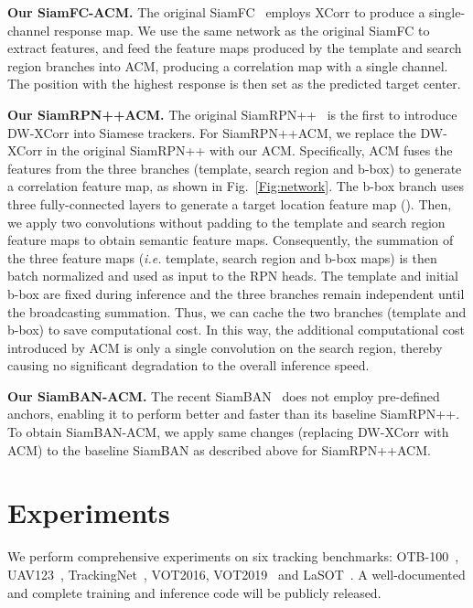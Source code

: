 \documentclass[10pt,twocolumn,letterpaper,final]{cvpr}
\begin{document}
\noindent\textbf{{Our SiamFC-ACM.}} The original SiamFC~\cite{bertinetto2016fully}
employs XCorr to produce a single-channel response map. We use the same network as the original SiamFC to extract features, and feed the feature maps produced by the template and search region branches into ACM, producing a correlation map with a single channel. The position with the highest response is then set as the predicted target center.





\noindent\textbf{{Our SiamRPN++ACM.}} The original SiamRPN++~\cite{li2019siamrpn} is the first to introduce DW-XCorr into Siamese trackers. For SiamRPN++ACM, we replace the DW-XCorr in the original SiamRPN++ with our ACM. Specifically, ACM fuses the features from the three branches (template, search region and b-box) to generate a correlation feature map, as shown in Fig.~\ref{Fig:network}. The b-box branch uses three fully-connected layers to generate a target location feature map (). Then, we apply two  convolutions without padding  to the template and search region feature maps to obtain semantic feature maps. Consequently, the summation of the three feature maps (\textit{i.e.} template, search region and b-box maps) is then batch normalized and used as input to the RPN heads. The template and initial b-box are fixed during inference and the three branches remain independent until the broadcasting summation. Thus, we can cache the two branches (template and b-box) to save computational cost. In this way, the additional computational cost introduced by ACM is only a single convolution on the search region, thereby causing no significant degradation to the overall inference speed. 



\noindent\textbf{{Our SiamBAN-ACM.}} The recent  SiamBAN~\cite{chen2020siamese} does not employ pre-defined anchors, enabling it to perform better and faster than its baseline SiamRPN++. To obtain SiamBAN-ACM, we apply same changes (replacing DW-XCorr with ACM) to the baseline SiamBAN as described above for SiamRPN++ACM.    






\section{Experiments}
We perform comprehensive experiments on six tracking benchmarks: OTB-100~\cite{wu2015object}, UAV123~\cite{mueller2016a}, TrackingNet~\cite{muller2018trackingnet}, VOT2016, VOT2019~\cite{VOT_TPAMI} and LaSOT~\cite{fan2019lasot}. 
A well-documented and complete training and inference code will be publicly released.
\end{document}
